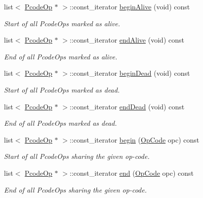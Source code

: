 \begin{DoxyCompactItemize}
list$<$ \mbox{\hyperlink{class_pcode_op}{Pcode\+Op}} $\ast$ $>$\+::const\+\_\+iterator \mbox{\hyperlink{class_pcode_op_bank_a6c299f27d8d5aafd64fdd91324cddc24}{begin\+Alive}} (void) const
\begin{DoxyCompactList}\small\item\em Start of all Pcode\+Ops marked as {\itshape alive}. \end{DoxyCompactList}\item 
list$<$ \mbox{\hyperlink{class_pcode_op}{Pcode\+Op}} $\ast$ $>$\+::const\+\_\+iterator \mbox{\hyperlink{class_pcode_op_bank_a4aa1fc23069148cd4004c5217d9ffaff}{end\+Alive}} (void) const
\begin{DoxyCompactList}\small\item\em End of all Pcode\+Ops marked as {\itshape alive}. \end{DoxyCompactList}\item 
list$<$ \mbox{\hyperlink{class_pcode_op}{Pcode\+Op}} $\ast$ $>$\+::const\+\_\+iterator \mbox{\hyperlink{class_pcode_op_bank_a11c4847402571c3bc56dce8adb4df2ea}{begin\+Dead}} (void) const
\begin{DoxyCompactList}\small\item\em Start of all Pcode\+Ops marked as {\itshape dead}. \end{DoxyCompactList}\item 
list$<$ \mbox{\hyperlink{class_pcode_op}{Pcode\+Op}} $\ast$ $>$\+::const\+\_\+iterator \mbox{\hyperlink{class_pcode_op_bank_a4827b640a1414da1049f7ee59460f71c}{end\+Dead}} (void) const
\begin{DoxyCompactList}\small\item\em End of all Pcode\+Ops marked as {\itshape dead}. \end{DoxyCompactList}\item 
list$<$ \mbox{\hyperlink{class_pcode_op}{Pcode\+Op}} $\ast$ $>$\+::const\+\_\+iterator \mbox{\hyperlink{class_pcode_op_bank_aea81ae2f9b0e176090a6b9f54107bc54}{begin}} (\mbox{\hyperlink{opcodes_8hh_abeb7dfb0e9e2b3114e240a405d046ea7}{Op\+Code}} opc) const
\begin{DoxyCompactList}\small\item\em Start of all Pcode\+Ops sharing the given op-\/code. \end{DoxyCompactList}\item 
list$<$ \mbox{\hyperlink{class_pcode_op}{Pcode\+Op}} $\ast$ $>$\+::const\+\_\+iterator \mbox{\hyperlink{class_pcode_op_bank_a25064445ec0c3929d233a86515e7b058}{end}} (\mbox{\hyperlink{opcodes_8hh_abeb7dfb0e9e2b3114e240a405d046ea7}{Op\+Code}} opc) const
\begin{DoxyCompactList}\small\item\em End of all Pcode\+Ops sharing the given op-\/code. \end{DoxyCompactList}\end{DoxyCompactItemize}


